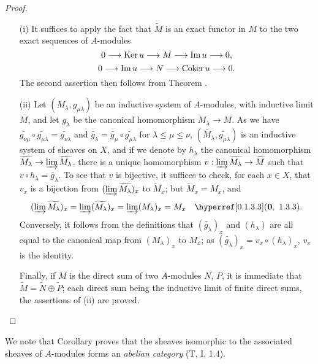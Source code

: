 \begin{proof}
\label{proof-1.1.3.9}
\medskip\noindent
\begin{itemize}
  \item[(i)] It suffices to apply the fact that $\widetilde{M}$ is an exact functor in $M$
     to the two exact sequences of $A$-modules
    \[
      0\longrightarrow{\mathop{\mathrm{Ker}}\nolimits}\, u\longrightarrow M\longrightarrow{\mathop{\mathrm{Im}}\nolimits}\, u\longrightarrow 0,
    \]
    \[
      0\longrightarrow{\mathop{\mathrm{Im}}\nolimits}\, u\longrightarrow N\longrightarrow{\mathop{\mathrm{Coker}}\nolimits}\, u\longrightarrow 0.
    \]
    The second assertion then follows from Theorem .
  \item[(ii)] Let $(M_\lambda,g_{\mu\lambda})$ be an inductive system of $A$-modules, with
    inductive limit $M$, and let $g_\lambda$ be the canonical homomorphism
    $M_\lambda\to M$. As we have
    $\widetilde{g_{\nu\mu}}\circ\widetilde{g_{\mu\lambda}}=\widetilde{g_{\nu\lambda}}$
    and $\widetilde{g_\lambda}=\widetilde{g_\mu}\circ\widetilde{g_{\mu\lambda}}$ for
    $\lambda\leqslant\mu\leqslant\nu$,
    $(\widetilde{M_\lambda},\widetilde{g_{\mu\lambda}})$ is an inductive system of
    sheaves on $X$, and if we denote by $h_\lambda$ the canonical homomorphism
    $\widetilde{M_\lambda}\to\varinjlim\widetilde{M_\lambda}$, there is a unique
    homomorphism $v:\varinjlim\widetilde{M_\lambda}\to\widetilde{M}$ such that
    $v\circ h_\lambda=\widetilde{g_\lambda}$. To see that $v$ is bijective, it suffices
    to check, for each $x\in X$, that $v_x$ is a bijection from
    $(\varinjlim\widetilde{M_\lambda})_x$ to $\widetilde{M}_x$; but $\widetilde{M}_x=M_x$, and
    \[
      (\varinjlim\widetilde{M_\lambda})_x=\varinjlim(\widetilde{M_\lambda})_x
      =\varinjlim(M_\lambda)_x=M_x\quad\sref[0]{0.1.3.3}.
    \]
    Conversely, it follows from the definitions that $(\widetilde{g_\lambda})_x$ and
    $(h_\lambda)$ are all equal to the canonical map from $(M_\lambda)_x$ to $M_x$; as
    $(\widetilde{g_\lambda})_x=v_x\circ(h_\lambda)_x$, $v_x$ is the identity.

    Finally, if $M$ is the direct sum of two $A$-modules $N$, $P$, it is immediate that
    $\widetilde{M}=\widetilde{N}\oplus\widetilde{P}$; each direct sum being the inductive
    limit of finite direct sums, the assertions of (ii) are proved.
\end{itemize}
\end{proof}

We note that Corollary  proves that the sheaves isomorphic to the associated sheaves
of $A$-modules forms an {\em abelian category} (T, I, 1.4).

